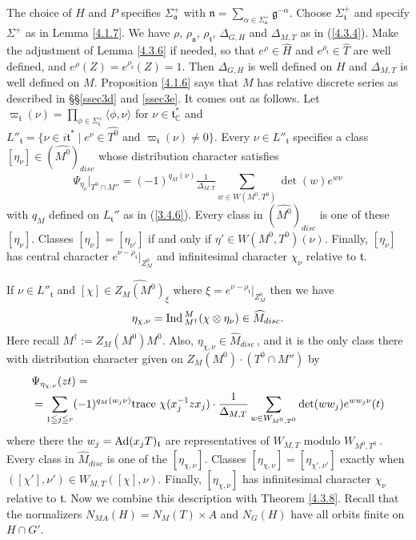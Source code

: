 \documentclass{conm-p-l}
\renewcommand{\gg}{\mathfrak{g}}
\def\ga{\mathfrak{a}}
\def\gg{\mathfrak{g}}
\def\gn{\mathfrak{n}}
\def\gt{\mathfrak{t}}
\def\Ad{{\rm Ad}}
\def\trace{{\rm trace\,\,}}
\def\Ind{{\rm Ind\,}}
\def\C{\mathbb{C}}
\begin{document}
The choice of $H$ and $P$ specifies $\Sigma_\ga^+$ with
$\gn = \sum_{\alpha \in \Sigma_\ga^+} \gg^{-\alpha}$.  Choose $\Sigma_\gt^+$
and specify $\Sigma^+$ as in Lemma \ref{4.1.7}.  We have $\rho$, $\rho_\ga$,
$\rho_\gt$, $\Delta_{G,H}$ and $\Delta_{M,T}$ as in (\ref{4.3.4}).  Make the
adjustment of Lemma \ref{4.3.6} if needed, so that $e^\rho \in \widehat{H}$ 
and $e^{\rho_\gt} \in \widehat{T}$ are well defined, and $e^\rho(Z) = 
e^{\rho_\gt}(Z) = 1$.  Then $\Delta_{G,H}$ is well defined on $H$ and
$\Delta_{M,T}$ is well defined on $M$.  
Proposition \ref{4.1.6} says
that $M$ has relative discrete series as described in \S\S \ref{ssec3d} 
and \ref{ssec3e}.  It comes out as follows.  Let $\varpi_\gt(\nu) =
\prod_{\phi \in \Sigma^+_\gt} \langle \phi,\nu\rangle$ for
$\nu \in \gt^*_\C$ and $L''_\gt = \{\nu \in i\gt^* \mid e^\nu \in
\widehat{T^0} \text{ and } \varpi_\gt(\nu) \ne 0\}$.  Every 
$\nu \in L''_\gt$ specifies a class $[\eta_\nu] \in (\widehat{M^0})_{disc}$
whose distribution character satisfies
$$
\Psi_{\eta_\nu}|_{T^0\cap M''} = (-1)^{q_M(\nu)}
\tfrac{1}{\Delta_{M,T}} {\sum}_{w \in W(M^0,T^0)} \det(w)e^{w\nu}
$$
with $q_M$ defined on $L_\gt''$ as in (\ref{3.4.6}).  Every class in
$(\widehat{M^0})_{disc}$ is one of these $[\eta_\nu]$.  Classes
$[\eta_\nu] = [\eta_{\nu'}]$ if and only if $\eta' \in W(M^0,T^0)(\nu)$.
Finally, $[\eta_\nu]$ has central character $e^{\nu - \rho_\gt}|_{Z_M^0}$
and infinitesimal character $\chi_\nu$ relative to $\gt$.

If $\nu \in L''_\gt$ and $[\chi] \in \widehat{Z_M(M^0)}_\xi$ where
$\xi = e^{\nu - \rho_\gt}|_{Z_M^0}$ then we have
\begin{equation}\label{4.4.3a}
\eta_{\chi,\nu}
= \Ind_{M^\dagger}^M (\chi \otimes \eta_\nu) \in \widehat{M}_{disc}.  
\end{equation}
Here recall $M^\dagger := Z_M(M^0)M^0$.  Also,
$\eta_{\chi,\nu} \in \widehat{M}_{disc}$\,, and it is the only
class there with distribution character given on 
$Z_M(M^0)\cdot(T^0\cap M'')$ by
\begin{equation}\label{4.4.3b}
\begin{aligned}
&\Psi_{\eta_{\chi,\nu}}(zt) = \\
&= \sum_{1\leqq j\leqq r} (-1)^{q_M(w_j\nu)}\trace \chi(x_j^{-1}zx_j)\cdot
\frac{1}{\Delta_{M,T}} \sum_{w \in W_{M^0,T^0}} \det(ww_j)e^{ww_j\nu}(t)
\end{aligned}
\end{equation}
where there the $w_j = \Ad(x_jT)_\gt$ are representatives of $W_{M,T}$
modulo $W_{M^0,T^0}$\,.  Every class in $\widehat{M}_{disc}$ is one of the
$[\eta_{\chi,\nu}]$.  Classes $[\eta_{\chi,\nu}] = [\eta_{\chi',\nu'}]$ 
exactly when $([\chi'],\nu') \in W_{M,T}([\chi],\nu)$.  Finally,
$[\eta_{\chi,\nu}]$ has infinitesimal character $\chi_\nu$ relative
to $\gt$.  Now we combine this description with Theorem \ref{4.3.8}.
Recall that the normalizers $N_{MA}(H) = N_M(T) \times A$ and $N_G(H)$ have
all orbits finite on $H \cap G'$.
\end{document}
